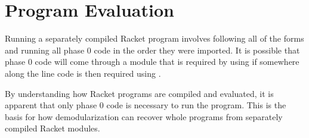 \section{Program Evaluation}
Running a separately compiled Racket program involves following all of the  forms and running all phase 0 code in the order they were imported.
It is possible that phase 0 code will come through a module that is required by using  if somewhere along the line code is then required using .

By understanding how Racket programs are compiled and evaluated, it is apparent that only phase 0 code is necessary to run the program. 
This is the basis for how demodularization can recover whole programs from separately compiled Racket modules. 
